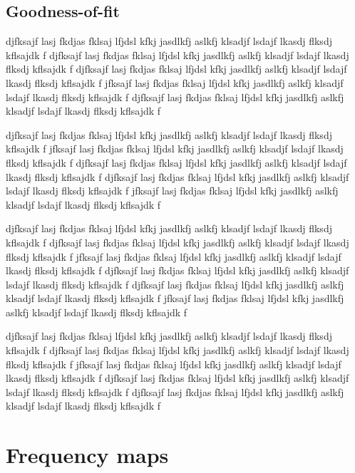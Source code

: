 \documentclass[twocolumn]{../../common/aa}
\begin{document}
\subsection{Goodness-of-fit}

djfksajf lasj fkdjas fklsaj lfjdsl kfkj jasdlkfj aslkfj klsadjf lsdajf lkasdj flksdj kflsajdk f
djfksajf lasj fkdjas fklsaj lfjdsl kfkj jasdlkfj aslkfj klsadjf lsdajf lkasdj flksdj kflsajdk f
djfksajf lasj fkdjas fklsaj lfjdsl kfkj jasdlkfj aslkfj klsadjf lsdajf lkasdj flksdj kflsajdk f
jfksajf lasj fkdjas fklsaj lfjdsl kfkj jasdlkfj aslkfj klsadjf lsdajf lkasdj flksdj kflsajdk f
djfksajf lasj fkdjas fklsaj lfjdsl kfkj jasdlkfj aslkfj klsadjf lsdajf lkasdj flksdj kflsajdk f

djfksajf lasj fkdjas fklsaj lfjdsl kfkj jasdlkfj aslkfj klsadjf lsdajf lkasdj flksdj kflsajdk f
jfksajf lasj fkdjas fklsaj lfjdsl kfkj jasdlkfj aslkfj klsadjf lsdajf lkasdj flksdj kflsajdk f
djfksajf lasj fkdjas fklsaj lfjdsl kfkj jasdlkfj aslkfj klsadjf lsdajf lkasdj flksdj kflsajdk f
djfksajf lasj fkdjas fklsaj lfjdsl kfkj jasdlkfj aslkfj klsadjf lsdajf lkasdj flksdj kflsajdk f
jfksajf lasj fkdjas fklsaj lfjdsl kfkj jasdlkfj aslkfj klsadjf lsdajf lkasdj flksdj kflsajdk f

djfksajf lasj fkdjas fklsaj lfjdsl kfkj jasdlkfj aslkfj klsadjf lsdajf lkasdj flksdj kflsajdk f
djfksajf lasj fkdjas fklsaj lfjdsl kfkj jasdlkfj aslkfj klsadjf lsdajf lkasdj flksdj kflsajdk f
jfksajf lasj fkdjas fklsaj lfjdsl kfkj jasdlkfj aslkfj klsadjf lsdajf lkasdj flksdj kflsajdk f
djfksajf lasj fkdjas fklsaj lfjdsl kfkj jasdlkfj aslkfj klsadjf lsdajf lkasdj flksdj kflsajdk f
djfksajf lasj fkdjas fklsaj lfjdsl kfkj jasdlkfj aslkfj klsadjf lsdajf lkasdj flksdj kflsajdk f
jfksajf lasj fkdjas fklsaj lfjdsl kfkj jasdlkfj aslkfj klsadjf lsdajf lkasdj flksdj kflsajdk f

djfksajf lasj fkdjas fklsaj lfjdsl kfkj jasdlkfj aslkfj klsadjf lsdajf lkasdj flksdj kflsajdk f
djfksajf lasj fkdjas fklsaj lfjdsl kfkj jasdlkfj aslkfj klsadjf lsdajf lkasdj flksdj kflsajdk f
jfksajf lasj fkdjas fklsaj lfjdsl kfkj jasdlkfj aslkfj klsadjf lsdajf lkasdj flksdj kflsajdk f
djfksajf lasj fkdjas fklsaj lfjdsl kfkj jasdlkfj aslkfj klsadjf lsdajf lkasdj flksdj kflsajdk f
djfksajf lasj fkdjas fklsaj lfjdsl kfkj jasdlkfj aslkfj klsadjf lsdajf lkasdj flksdj kflsajdk f


\section{Frequency maps}
\label{sec:maps}
\end{document}
